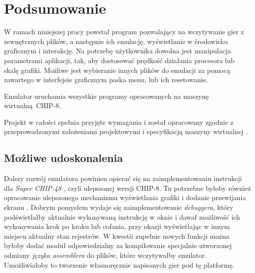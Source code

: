 \section{Podsumowanie}
W ramach niniejszej pracy powstał program pozwalający na wczytywanie gier z zewnętrznych plików, a następnie ich emulację, wyświetlanie w środowisku graficznym i interakcję. Na potrzebę użytkownika dowolna jest manipulacja parametrami aplikacji, tak, aby dostosować prędkość działania procesora lub skalę grafiki. Możliwe jest wybieranie innych plików do emulacji za pomocą zawartego w interfejsie graficznym paska menu, lub ich resetowanie.

Emulator uruchamia wszystkie programy opracowanych na maszynę wirtualną~{CHIP-8}.

Projekt w całości spełnia przyjęte wymagania i został opracowany zgodnie z przeprowadzonymi założeniami projektowymi i specyfikacją maszyny wirtualnej \cite{Cowgod}.


\subsection{Możliwe udoskonalenia}
Dalszy rozwój emulatora powinien opierać się na zaimplementowaniu instrukcji dla \textit{Super CHIP-48} \cite{Cowgod}, czyli ulepszonej wersji CHIP-8. Tu potrzebne byłoby również opracowanie ulepszonego mechanizmu wyświetlania grafiki i dodanie przewijania ekranu \cite{Cowgod}. Dobrym pomysłem wydaje się zaimplementowanie \textit{debuggera}, który podświetlałby aktualnie wykonywaną instrukcję w oknie i dawał możliwość ich wykonywania krok po kroku lub cofania, przy okazji wyświetlając w innym miejscu aktualny stan rejestrów. W kwestii zupełnie nowych funkcji można byłoby dodać moduł odpowiedzialny za kompilowanie specjalnie utworzonej odmiany \textit{języka assemblera} do plików, które wczytywałby emulator. Umożliwiałoby to tworzenie własnoręcznie napisanych gier pod tę platformę.